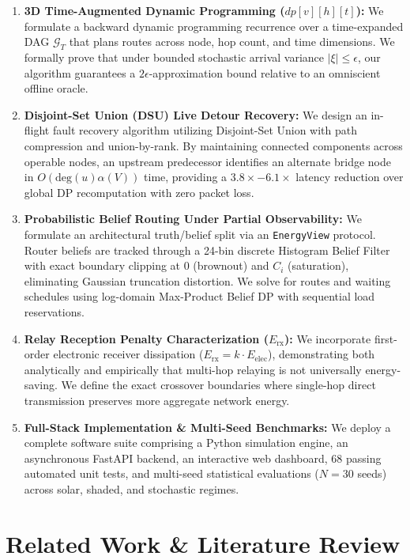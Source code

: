 \documentclass[journal]{IEEEtran}
\begin{document}
\begin{enumerate}
    \item \textbf{3D Time-Augmented Dynamic Programming ($dp[v][h][t]$):} We formulate a backward dynamic programming recurrence over a time-expanded DAG $\mathcal{G}_T$ that plans routes across node, hop count, and time dimensions. We formally prove that under bounded stochastic arrival variance $|\xi| \le \epsilon$, our algorithm guarantees a $2\epsilon$-approximation bound relative to an omniscient offline oracle.
    \item \textbf{Disjoint-Set Union (DSU) Live Detour Recovery:} We design an in-flight fault recovery algorithm utilizing Disjoint-Set Union with path compression and union-by-rank. By maintaining connected components across operable nodes, an upstream predecessor identifies an alternate bridge node in $O(\text{deg}(u)\alpha(V))$ time, providing a $3.8\times - 6.1\times$ latency reduction over global DP recomputation with zero packet loss.
    \item \textbf{Probabilistic Belief Routing Under Partial Observability:} We formulate an architectural truth/belief split via an \texttt{EnergyView} protocol. Router beliefs are tracked through a 24-bin discrete Histogram Belief Filter with exact boundary clipping at 0 (brownout) and $C_i$ (saturation), eliminating Gaussian truncation distortion. We solve for routes and waiting schedules using log-domain Max-Product Belief DP with sequential load reservations.
    \item \textbf{Relay Reception Penalty Characterization ($E_{\text{rx}}$):} We incorporate first-order electronic receiver dissipation ($E_{\text{rx}} = k \cdot E_{\text{elec}}$), demonstrating both analytically and empirically that multi-hop relaying is not universally energy-saving. We define the exact crossover boundaries where single-hop direct transmission preserves more aggregate network energy.
    \item \textbf{Full-Stack Implementation \& Multi-Seed Benchmarks:} We deploy a complete software suite comprising a Python simulation engine, an asynchronous FastAPI backend, an interactive web dashboard, 68 passing automated unit tests, and multi-seed statistical evaluations ($N=30$ seeds) across solar, shaded, and stochastic regimes.
\end{enumerate}

\section{Related Work \& Literature Review}
\end{document}
